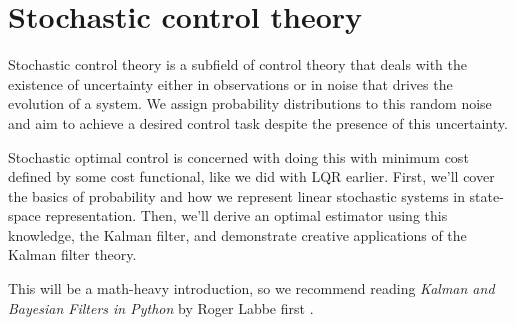
\chapter{Stochastic control theory}
\label{ch:stochastic_control_theory}

Stochastic control theory is a subfield of control theory that deals with the
existence of uncertainty either in observations or in noise that drives the
evolution of a \gls{system}. We assign probability distributions to this random
noise and aim to achieve a desired control task despite the presence of this
uncertainty.

Stochastic optimal control is concerned with doing this with minimum cost
defined by some cost functional, like we did with LQR earlier. First, we'll
cover the basics of probability and how we represent linear stochastic
\glspl{system} in state-space representation. Then, we'll derive an optimal
estimator using this knowledge, the Kalman filter, and demonstrate creative
applications of the Kalman filter theory.

This will be a math-heavy introduction, so we recommend reading \textit{Kalman
and Bayesian Filters in Python} by Roger Labbe first
\cite{bib:kalman_and_bayesian_filters_in_python}.

\renewcommand*{\chapterpath}{\partpath/stochastic-control-theory}










